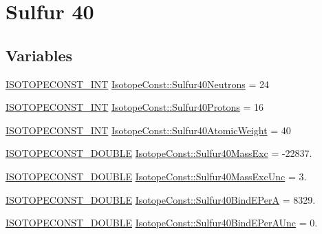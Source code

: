 \hypertarget{group___isotope_const-_sulfur-_s40}{}\section{Sulfur 40}
\label{group___isotope_const-_sulfur-_s40}
\subsection*{Variables}
\begin{DoxyCompactItemize}
\item 
\mbox{\hyperlink{group___isotope_const-_macros_ga5f18360b3e99483a35c32d789e62621c}{I\+S\+O\+T\+O\+P\+E\+C\+O\+N\+S\+T\+\_\+\+I\+NT}} \mbox{\hyperlink{group___isotope_const-_sulfur-_s40_gac6ef37c08a58f64bb9c7995ba0bad8ac}{Isotope\+Const\+::\+Sulfur40\+Neutrons}} = 24
\item 
\mbox{\hyperlink{group___isotope_const-_macros_ga5f18360b3e99483a35c32d789e62621c}{I\+S\+O\+T\+O\+P\+E\+C\+O\+N\+S\+T\+\_\+\+I\+NT}} \mbox{\hyperlink{group___isotope_const-_sulfur-_s40_ga7ce4b83782e814506cb11380a9b4ce4c}{Isotope\+Const\+::\+Sulfur40\+Protons}} = 16
\item 
\mbox{\hyperlink{group___isotope_const-_macros_ga5f18360b3e99483a35c32d789e62621c}{I\+S\+O\+T\+O\+P\+E\+C\+O\+N\+S\+T\+\_\+\+I\+NT}} \mbox{\hyperlink{group___isotope_const-_sulfur-_s40_ga8a5e3e5ce45439580402196f47fd59f8}{Isotope\+Const\+::\+Sulfur40\+Atomic\+Weight}} = 40
\item 
\mbox{\hyperlink{group___isotope_const-_macros_ga8f45a7272ce02c0b4c65c44636ed719a}{I\+S\+O\+T\+O\+P\+E\+C\+O\+N\+S\+T\+\_\+\+D\+O\+U\+B\+LE}} \mbox{\hyperlink{group___isotope_const-_sulfur-_s40_gad149c99aa3d0e7dbf1d3bce3eb3bffc8}{Isotope\+Const\+::\+Sulfur40\+Mass\+Exc}} = -\/22837.
\item 
\mbox{\hyperlink{group___isotope_const-_macros_ga8f45a7272ce02c0b4c65c44636ed719a}{I\+S\+O\+T\+O\+P\+E\+C\+O\+N\+S\+T\+\_\+\+D\+O\+U\+B\+LE}} \mbox{\hyperlink{group___isotope_const-_sulfur-_s40_gaa2ef5df6d32d94eea4dabed55a312660}{Isotope\+Const\+::\+Sulfur40\+Mass\+Exc\+Unc}} = 3.
\item 
\mbox{\hyperlink{group___isotope_const-_macros_ga8f45a7272ce02c0b4c65c44636ed719a}{I\+S\+O\+T\+O\+P\+E\+C\+O\+N\+S\+T\+\_\+\+D\+O\+U\+B\+LE}} \mbox{\hyperlink{group___isotope_const-_sulfur-_s40_gad57266f86b5ae0552afa25ef52db2aed}{Isotope\+Const\+::\+Sulfur40\+Bind\+E\+PerA}} = 8329.
\item 
\mbox{\hyperlink{group___isotope_const-_macros_ga8f45a7272ce02c0b4c65c44636ed719a}{I\+S\+O\+T\+O\+P\+E\+C\+O\+N\+S\+T\+\_\+\+D\+O\+U\+B\+LE}} \mbox{\hyperlink{group___isotope_const-_sulfur-_s40_ga351dedaf6ec9fc328fe80036d84b6bcd}{Isotope\+Const\+::\+Sulfur40\+Bind\+E\+Per\+A\+Unc}} = 0.

\end{DoxyCompactItemize}
